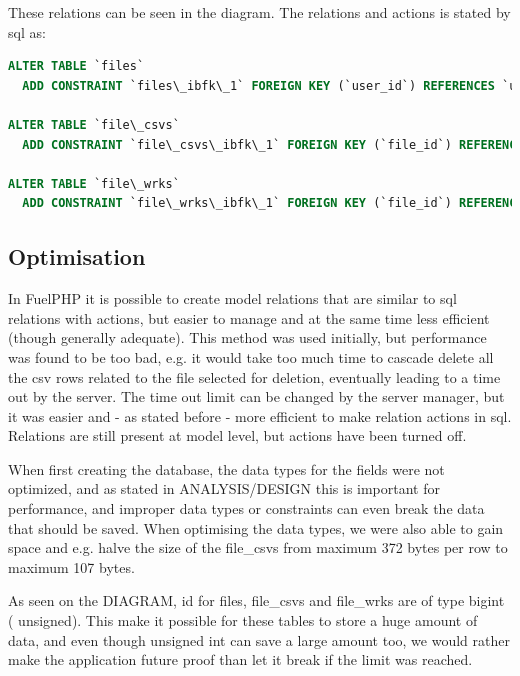 These relations can be seen in the diagram. The relations and actions is stated by sql as:

\begin{lstlisting}[language=sql]
ALTER TABLE `files`
  ADD CONSTRAINT `files\_ibfk\_1` FOREIGN KEY (`user_id`) REFERENCES `users` (`id`) ON DELETE NO ACTION ON UPDATE NO ACTION;

ALTER TABLE `file\_csvs`
  ADD CONSTRAINT `file\_csvs\_ibfk\_1` FOREIGN KEY (`file_id`) REFERENCES `files` (`id`) ON DELETE CASCADE ON UPDATE NO ACTION;

ALTER TABLE `file\_wrks`
  ADD CONSTRAINT `file\_wrks\_ibfk\_1` FOREIGN KEY (`file_id`) REFERENCES `files` (`id`) ON DELETE CASCADE ON UPDATE NO ACTION;
\end{lstlisting}

\subsection{Optimisation}

In FuelPHP it is possible to create model relations that are similar to sql relations with actions, but easier to manage and at the same time less efficient (though generally adequate). This method was used initially, but performance was found to be too bad, e.g. it would take too much time to cascade delete all the csv rows related to the file selected for deletion, eventually leading to a time out by the server. The time out limit can be changed by the server manager, but it was easier and - as stated before - more efficient to make relation actions in sql. Relations are still present at model level, but actions have been turned off.

When first creating the database, the data types for the fields were not optimized, and as stated in ANALYSIS/DESIGN this is important for performance, and improper data types or constraints can even break the data that should be saved. When optimising the data types, we were also able to gain space and e.g. halve the size of the \textsf{file\_csvs} from maximum 372 bytes per row to maximum 107 bytes.

As seen on the DIAGRAM, \textsf{id} for  \textsf{files, file\_csvs} and  \textsf{file\_wrks} are of type \textsf{bigint} ( \textsf{unsigned}). This make it possible for these tables to store a huge amount of data, and even though \textsf{unsigned int} can save a large amount too, we would rather make the application future proof than let it break if the limit was reached.

